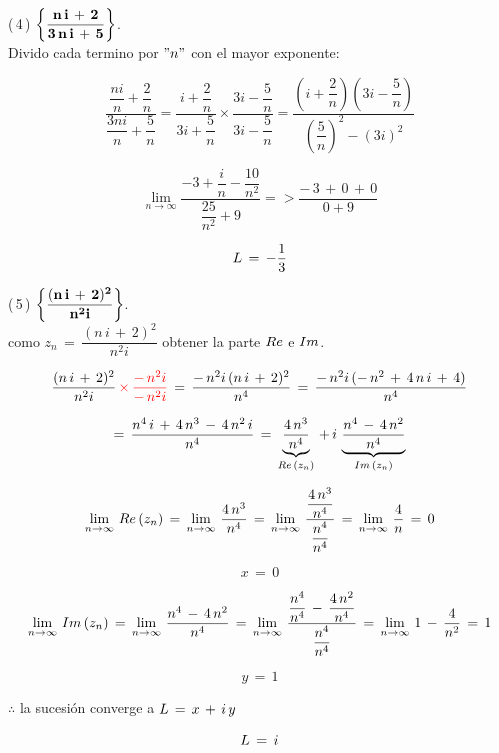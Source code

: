 \documentclass[a4paper,11pt,openany]{book}
\begin{document}
\textcolor{ao(english)}{(\,4\,)} $\bf{\left\{\dfrac{n\,i\,+\,2}{3\,n\,i\,+\,5}\right\}}$.\\

 Divido cada termino por $"n"$ con el mayor exponente:
 
 $$\dfrac{\dfrac{n i}{n}+\dfrac{2}{n}}{\dfrac{3n i}{n}+\dfrac{5}{n}} = \dfrac{i+\dfrac{2}{n}}{3i+\dfrac{5}{n}} \times \dfrac{3i-\dfrac{5}{n}}{3i-\dfrac{5}{n}} = \dfrac{\left(i+ \dfrac{2}{n} \right) \left(3i- \dfrac{5}{n} \right)}{ \left( \dfrac{5}{n} \right)^{2} - (3i)^{2} } $$
 
 $$\displaystyle\lim_{n \to \infty} \dfrac{-3+\dfrac{i}{n}-\dfrac{10}{n^{2}}}{\dfrac{25}{n^{2}}+9} => \dfrac{-\,3\,+\,0\,+\,0}{0 +9} $$
 
 $$\mathnormal{L}\,=\,-\dfrac{1}{3}$$

\textcolor{ao(english)}{(\,5\,)} $\bf{\left\{\dfrac{(n\,i\,+\,2)^{2}}{n^{2}i}\right\}}$.\\

\textcolor{ao(english)}{} como $z_{n}\,=\,\dfrac{(n\,i\,+\,2)^{2}}{n^{2}i}$ obtener la parte $\mathnormal{Re}$ e $\mathnormal{Im}$.

$$\dfrac{(n\,i\,+\,2)^{2}}{n^{2}i}\,\textcolor{red}{\times\,\dfrac{-\,n^{2}i}{-\,n^{2}i}}\,=\,\dfrac{-\,n^{2}i\,(n\,i\,+\,2)^{2}}{n^{4}}\,=\,\dfrac{-\,n^{2}i\,(-\,n^{2}\,+\,4\,n\,i\,+\,4)}{n^{4}}$$

$$=\,\dfrac{n^{4}\,i\,+\,4\,n^{3}\,-\,4\,n^{2}\,i}{n^{4}}\,=\,\underbrace{\dfrac{4\,n^{3}}{n^{4}}}_{\mathnormal{Re}\,(z_{n})}\,+\,i\,\underbrace{\dfrac{n^{4}\,-\,4\,n^{2}}{n^{4}}}_{\mathnormal{Im}\,(z_{n})}$$

$$\displaystyle\lim_{n \to \infty}\,\mathnormal{Re}\,(z_{n})\,=\,\displaystyle\lim_{n \to \infty}\,\dfrac{4\,n^{3}}{n^{4}}\,=\,\displaystyle\lim_{n \to \infty}\,\dfrac{\dfrac{4\,n^{3}}{n^{4}}}{\dfrac{n^{4}}{n^{4}}}\,=\,\displaystyle\lim_{n \to \infty}\,\dfrac{4}{n}\,=\,0$$

$$x\,=\,0$$

$$\displaystyle\lim_{n \to \infty}\,\mathnormal{Im}\,(z_{n})\,=\,\displaystyle\lim_{n \to \infty}\,\dfrac{n^{4}\,-\,4\,n^{2}}{n^{4}}\,=\,\displaystyle\lim_{n \to \infty}\,\dfrac{\dfrac{n^{4}}{n^{4}}\,-\,\dfrac{4\,n^{2}}{n^{4}}}{\dfrac{n^{4}}{n^{4}}}\,=\,\displaystyle\lim_{n \to \infty}\,1\,-\,\dfrac{4}{n^{2}}\,=\,1$$

$$y\,=\,1$$

$\therefore$ la sucesión converge a $\mathnormal{L}\,=\,x\,+\,i\,y$

$$\mathnormal{L}\,=\,i$$
\end{document}
